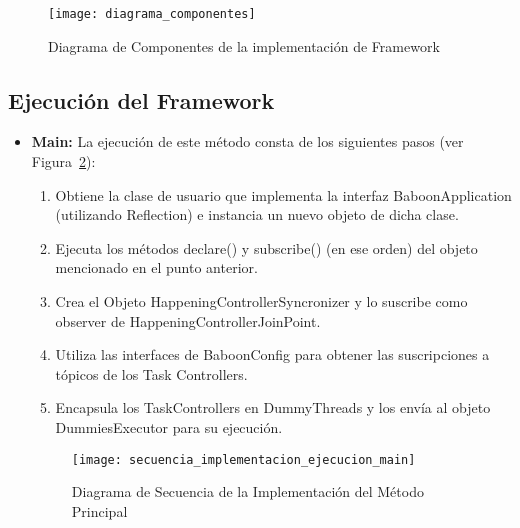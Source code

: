 \begin{figure}[H]
	\vspace*{-4cm}
	\hspace{-1,60cm}
	\texttt{[image: diagrama\_componentes]}
	\caption{Diagrama de Componentes de la implementación de \nombreFramework
	Framework}
	\label{fig:diagrama_componentes}
\end{figure}


\subsection{Ejecución del Framework}

\begin{itemize}
  \item \textbf{Main: } La ejecución de este método consta de
  los siguientes pasos (ver
  Figura~\ref{fig:diagrama_secuencia_implementacion_ejecucion_main}):
  	\begin{enumerate}
  	  \item Obtiene la clase de usuario que implementa la interfaz
  	  BaboonApplication (utilizando Reflection) e instancia un nuevo objeto de
  	  dicha clase.
  	  \item Ejecuta los métodos declare() y subscribe() (en ese orden) del
  	  objeto mencionado en el punto anterior.
  	  \item Crea el Objeto HappeningControllerSyncronizer y lo suscribe
  	  como observer de HappeningControllerJoinPoint.
  	  \item Utiliza las interfaces de BaboonConfig para obtener las
  	  suscripciones a tópicos de los Task Controllers.
  	  \item Encapsula los TaskControllers en DummyThreads y los envía al objeto
  	  DummiesExecutor para su ejecución.
  	\end{enumerate}
  	
 \begin{figure}[H]
	\hspace{-2,90cm}
	\texttt{[image: secuencia\_implementacion\_ejecucion\_main]}
	\caption{Diagrama de Secuencia de la Implementación del Método Principal}
	\label{fig:diagrama_secuencia_implementacion_ejecucion_main}
\end{figure}



\end{itemize}
